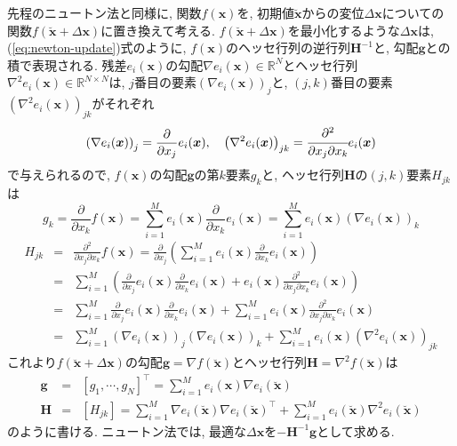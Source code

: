 \documentclass[dvipdfmx,a4paper]{jsarticle}
\begin{document}
先程のニュートン法と同様に, 関数$f(\bm{x})$を, 初期値$\breve{\bm{x}}$からの変位$\Delta \bm{x}$についての関数$f(\breve{\bm{x}} + \Delta \bm{x})$に置き換えて考える.
$f(\breve{\bm{x}} + \Delta \bm{x})$を最小化するような$\Delta \bm{x}$は, (\ref{eq:newton-update})式のように, $f(\bm{x})$のヘッセ行列の逆行列$\bm{H}^{-1}$と, 勾配$\bm{g}$との積で表現される.
残差$e_i(\bm{x})$の勾配$\nabla e_i(\bm{x}) \in \mathbb{R}^N$とヘッセ行列$\nabla^2 e_i(\bm{x}) \in \mathbb{R}^{N \times N}$は, $j$番目の要素$\left( \nabla e_i(\bm{x}) \right)_j$と, $(j, k)$番目の要素$\left( \nabla^2 e_i(\bm{x}) \right)_{jk}$がそれぞれ
\begin{eqnarray}
    \left( \nabla e_i(\bm{x}) \right)_j
    = \frac{\partial}{\partial x_j} e_i(\bm{x}), \quad
    \left( \nabla^2 e_i(\bm{x}) \right)_{jk}
    = \cfrac{\partial^2}{\partial x_j \partial x_k} e_i(\bm{x})
\end{eqnarray}
で与えられるので, $f(\bm{x})$の勾配$\bm{g}$の第$k$要素$g_k$と, ヘッセ行列$\bm{H}$の$(j, k)$要素$H_{jk}$は
\begin{equation}
    g_k = \frac{\partial}{\partial x_k} f(\bm{x})
    = \sum_{i = 1}^M e_i(\bm{x}) \frac{\partial}{\partial x_k} e_i(\bm{x})
    = \sum_{i = 1}^M e_i(\bm{x}) \left( \nabla e_i(\bm{x}) \right)_k
\end{equation}
\begin{eqnarray}
    H_{jk} &=& \frac{\partial^2}{\partial x_j \partial x_k} f(\bm{x})
    = \frac{\partial}{\partial x_j} \left(
    \sum_{i = 1}^M e_i(\bm{x}) \frac{\partial}{\partial x_k} e_i(\bm{x}) \right) \nonumber \\
    &=& \sum_{i = 1}^M \left( \frac{\partial}{\partial x_j} e_i(\bm{x})
    \frac{\partial}{\partial x_k} e_i(\bm{x})
    + e_i(\bm{x}) \frac{\partial^2}{\partial x_j \partial x_k} e_i(\bm{x}) \right) \nonumber \\
    &=& \sum_{i = 1}^M \frac{\partial}{\partial x_j} e_i(\bm{x})
    \frac{\partial}{\partial x_k} e_i(\bm{x})
    + \sum_{i = 1}^M e_i(\bm{x}) \frac{\partial^2}{\partial x_j \partial x_k} e_i(\bm{x}) \nonumber \\
    &=& \sum_{i = 1}^M \left( \nabla e_i(\bm{x}) \right)_j
    \left( \nabla e_i(\bm{x}) \right)_k +
    \sum_{i = 1}^M e_i(\bm{x}) \left( \nabla^2 e_i(\bm{x}) \right)_{jk}
\end{eqnarray}
これより$f(\breve{\bm{x}} + \Delta \bm{x})$の勾配$\bm{g} = \nabla f(\breve{\bm{x}})$とヘッセ行列$\bm{H} = \nabla^2 f(\breve{\bm{x}})$は
\begin{eqnarray}
    \bm{g} &=& \left[ g_1, \cdots, g_N \right]^\top
    = \sum_{i = 1}^M e_i(\bm{x}) \nabla e_i(\breve{\bm{x}})
    \label{eq:gauss-newton-gradient} \\
    \bm{H} &=& \left[ H_{jk} \right]
    = \sum_{i = 1}^M \nabla e_i(\breve{\bm{x}}) \nabla e_i(\breve{\bm{x}})^\top +
    \sum_{i = 1}^M e_i(\breve{\bm{x}}) \nabla^2 e_i(\breve{\bm{x}})
    \label{eq:gauss-newton-hessian}
\end{eqnarray}
のように書ける.
ニュートン法では, 最適な$\Delta \bm{x}$を$-\bm{H}^{-1} \bm{g}$として求める.
\end{document}
